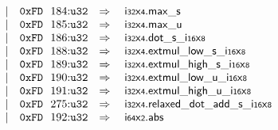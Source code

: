 $$\begin{array}[t]{@{}lrrl@{}l@{}l@{}l@{}}
& & | & \mathtt{0xFD}~~184{:}{\mathtt{u32}} & \quad\Rightarrow\quad{} & {\mathsf{i{\scriptstyle 32}}}{\mathsf{x}}{\mathsf{{\scriptstyle 4}}} {.} {\mathsf{max}}{\mathsf{\_}}{\mathsf{s}} \\
& & | & \mathtt{0xFD}~~185{:}{\mathtt{u32}} & \quad\Rightarrow\quad{} & {\mathsf{i{\scriptstyle 32}}}{\mathsf{x}}{\mathsf{{\scriptstyle 4}}} {.} {\mathsf{max}}{\mathsf{\_}}{\mathsf{u}} \\
& & | & \mathtt{0xFD}~~186{:}{\mathtt{u32}} & \quad\Rightarrow\quad{} & {\mathsf{i{\scriptstyle 32}}}{\mathsf{x}}{\mathsf{{\scriptstyle 4}}} {.} {{\mathsf{dot}}{\mathsf{\_}}{\mathsf{s}}}{\mathsf{\_}}{{\mathsf{i{\scriptstyle 16}}}{\mathsf{x}}{\mathsf{{\scriptstyle 8}}}} \\
& & | & \mathtt{0xFD}~~188{:}{\mathtt{u32}} & \quad\Rightarrow\quad{} & {\mathsf{i{\scriptstyle 32}}}{\mathsf{x}}{\mathsf{{\scriptstyle 4}}} {.} {{\mathsf{extmul}}{\mathsf{\_}}{\mathsf{low}}{\mathsf{\_}}{\mathsf{s}}}{\mathsf{\_}}{{\mathsf{i{\scriptstyle 16}}}{\mathsf{x}}{\mathsf{{\scriptstyle 8}}}} \\
& & | & \mathtt{0xFD}~~189{:}{\mathtt{u32}} & \quad\Rightarrow\quad{} & {\mathsf{i{\scriptstyle 32}}}{\mathsf{x}}{\mathsf{{\scriptstyle 4}}} {.} {{\mathsf{extmul}}{\mathsf{\_}}{\mathsf{high}}{\mathsf{\_}}{\mathsf{s}}}{\mathsf{\_}}{{\mathsf{i{\scriptstyle 16}}}{\mathsf{x}}{\mathsf{{\scriptstyle 8}}}} \\
& & | & \mathtt{0xFD}~~190{:}{\mathtt{u32}} & \quad\Rightarrow\quad{} & {\mathsf{i{\scriptstyle 32}}}{\mathsf{x}}{\mathsf{{\scriptstyle 4}}} {.} {{\mathsf{extmul}}{\mathsf{\_}}{\mathsf{low}}{\mathsf{\_}}{\mathsf{u}}}{\mathsf{\_}}{{\mathsf{i{\scriptstyle 16}}}{\mathsf{x}}{\mathsf{{\scriptstyle 8}}}} \\
& & | & \mathtt{0xFD}~~191{:}{\mathtt{u32}} & \quad\Rightarrow\quad{} & {\mathsf{i{\scriptstyle 32}}}{\mathsf{x}}{\mathsf{{\scriptstyle 4}}} {.} {{\mathsf{extmul}}{\mathsf{\_}}{\mathsf{high}}{\mathsf{\_}}{\mathsf{u}}}{\mathsf{\_}}{{\mathsf{i{\scriptstyle 16}}}{\mathsf{x}}{\mathsf{{\scriptstyle 8}}}} \\
& & | & \mathtt{0xFD}~~275{:}{\mathtt{u32}} & \quad\Rightarrow\quad{} & {\mathsf{i{\scriptstyle 32}}}{\mathsf{x}}{\mathsf{{\scriptstyle 4}}} {.} {{\mathsf{relaxed\_dot\_add}}{\mathsf{\_}}{\mathsf{s}}}{\mathsf{\_}}{{\mathsf{i{\scriptstyle 16}}}{\mathsf{x}}{\mathsf{{\scriptstyle 8}}}} \\
& & | & \mathtt{0xFD}~~192{:}{\mathtt{u32}} & \quad\Rightarrow\quad{} & {\mathsf{i{\scriptstyle 64}}}{\mathsf{x}}{\mathsf{{\scriptstyle 2}}} {.} \mathsf{abs} \\

\end{array}$$

